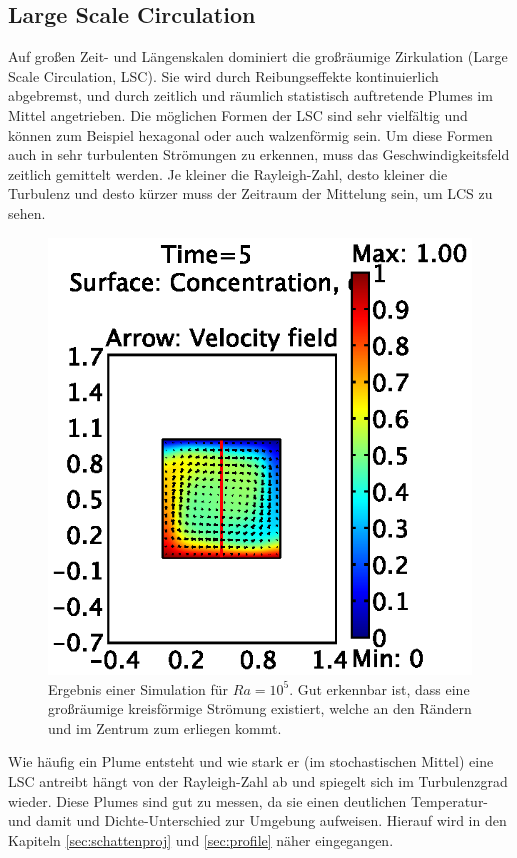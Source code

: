 \documentclass[12pt,a4paper,titlepage,headinclude]{scrartcl}
\numberwithin{equation}{subsection}
\begin{document}
\subsection{Large Scale Circulation}
Auf großen Zeit- und Längenskalen dominiert die großräumige Zirkulation (Large Scale Circulation, LSC).
Sie wird durch Reibungseffekte kontinuierlich abgebremst, und durch zeitlich und räumlich statistisch auftretende Plumes im Mittel angetrieben.
Die möglichen Formen der LSC sind sehr vielfältig und können zum Beispiel hexagonal oder auch walzenförmig sein.
Um diese Formen auch in sehr turbulenten Strömungen zu erkennen, muss das Geschwindigkeitsfeld zeitlich gemittelt werden. 
Je kleiner die Rayleigh-Zahl, desto kleiner die Turbulenz und desto kürzer muss der Zeitraum der Mittelung sein, um LCS zu sehen.
\begin{figure}[!ht]
\centering
\includegraphics{1e5.eps}
\caption{Ergebnis einer Simulation für $Ra=10^5$. Gut erkennbar ist, dass eine großräumige kreisförmige Strömung existiert, welche an den Rändern und im Zentrum zum erliegen kommt.}
\label{fig:1e5_num}
\end{figure}

Wie häufig ein Plume entsteht und wie stark er (im stochastischen Mittel) eine LSC antreibt hängt von der Rayleigh-Zahl ab und spiegelt sich im Turbulenzgrad wieder.
Diese Plumes sind gut zu messen, da sie einen deutlichen Temperatur- und damit und Dichte-Unterschied zur Umgebung aufweisen.
Hierauf wird in den Kapiteln \ref{sec:schattenproj} und \ref{sec:profile} näher eingegangen.
\end{document}
